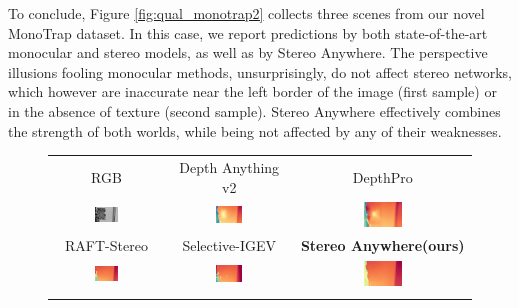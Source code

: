 \documentclass[10pt,twocolumn,letterpaper]{article}
\newcommand{\method}[0]{Stereo Anywhere\xspace}
\newcommand{\dataset}[0]{MonoTrap\xspace}
\begin{document}
\clearpage

To conclude, Figure \ref{fig:qual_monotrap2} collects three scenes from our novel \dataset dataset. In this case, we report predictions by both state-of-the-art monocular and stereo models, as well as by \method.
The perspective illusions fooling monocular methods, unsurprisingly, do not affect stereo networks, which however are inaccurate near the left border of the image (first sample) or in the absence of texture (second sample).
\method effectively combines the strength of both worlds, while being not affected by any of their weaknesses.

\begin{figure}[h]
    \centering
    \renewcommand{\tabcolsep}{1pt}
    \begin{tabular}{ccc}
        \small RGB &
        \small Depth Anything v2 \cite{depth_anything_v2} &
        \small DepthPro \cite{depthpro} \\
        \includegraphics[width=0.23\textwidth]{imgs/monotrap/rgb/2.jpg} & 
        \includegraphics[width=0.23\textwidth]{imgs/monotrap/mono/dav2/2.jpg}  &
        \includegraphics[width=0.23\textwidth]{imgs/monotrap/mono/depthpro/2.jpg} \\
        \small RAFT-Stereo \cite{lipson2021raft} &
        \small Selective-IGEV \cite{wang2024selective} &      
        \textbf{\method (ours)} \\
        \includegraphics[width=0.23\textwidth]{imgs/monotrap/stereo/RAFT-Stereo/2.jpg} &
        \includegraphics[width=0.23\textwidth]{imgs/monotrap/stereo/Selective/2.jpg} &
        \includegraphics[width=0.23\textwidth]{imgs/monotrap/ours/2.jpg} \\ \\


\end{tabular}
\end{figure}
\end{document}
